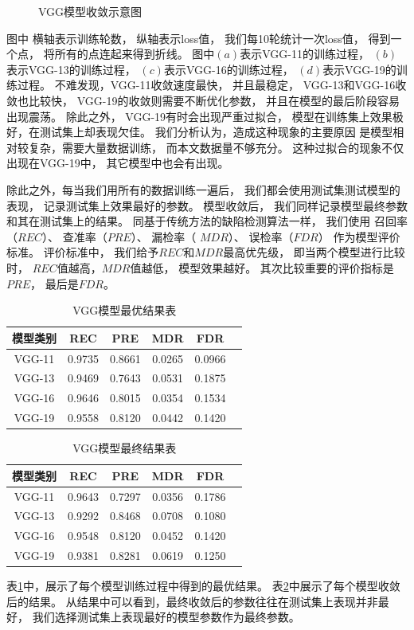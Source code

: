 \begin{figure}[htbp]
\caption{VGG模型收敛示意图}
\label{fig:vggshoulian}
\end{figure}
图中
横轴表示训练轮数，
纵轴表示loss值，
我们每10轮统计一次loss值，
得到一个点，
将所有的点连起来得到折线。
图中$(a)$表示VGG-11的训练过程，
$(b)$表示VGG-13的训练过程，
$(c)$表示VGG-16的训练过程，
$(d)$表示VGG-19的训练过程。
不难发现，VGG-11收敛速度最快，
并且最稳定，
VGG-13和VGG-16收敛也比较快，
VGG-19的收敛则需要不断优化参数，
并且在模型的最后阶段容易出现震荡。
除此之外，
VGG-19有时会出现严重过拟合，
模型在训练集上效果极好，在测试集上却表现欠佳。
我们分析认为，造成这种现象的主要原因
是模型相对较复杂，需要大量数据训练，
而本文数据量不够充分。
这种过拟合的现象不仅出现在VGG-19中，
其它模型中也会有出现。

除此之外，每当我们用所有的数据训练一遍后，
我们都会使用测试集测试模型的表现，
记录测试集上效果最好的参数。
模型收敛后，
我们同样记录模型最终参数和其在测试集上的结果。
同基于传统方法的缺陷检测算法一样，
我们使用
召回率（$REC$）、
查准率（$PRE$）、
漏检率（ $MDR$）、
误检率（$FDR$）
作为模型评价标准。
评价标准中，
我们给予$REC$和$MDR$最高优先级，
即当两个模型进行比较时，
$REC$值越高，$MDR$值越低，
模型效果越好。
其次比较重要的评价指标是$PRE$，
最后是$FDR$。
\begin{table}[htbp]
\centering
\begin{tabular}{cccccp{38mm}}
\toprule
\textbf{模型类别} & \textbf{REC} & \textbf{PRE} & \textbf{MDR} & \textbf{FDR}\\
\midrule
\mbox{VGG-11} & 0.9735 & 0.8661 & 0.0265 & 0.0966\\
\mbox{VGG-13} & 0.9469 & 0.7643 & 0.0531 & 0.1875\\
\mbox{VGG-16} & 0.9646 & 0.8015 & 0.0354 & 0.1534\\
\mbox{VGG-19} & 0.9558 & 0.8120 & 0.0442 & 0.1420\\
\bottomrule
\end{tabular}
\caption{VGG模型最优结果表}
\label{tab:zuiyoujieguo}
\end{table}
\begin{table}[htbp]
\centering
\begin{tabular}{cccccp{38mm}}
\toprule
\textbf{模型类别} & \textbf{REC} & \textbf{PRE} & \textbf{MDR} & \textbf{FDR}\\
\midrule
\mbox{VGG-11} & 0.9643 & 0.7297 & 0.0356 & 0.1786\\
\mbox{VGG-13} & 0.9292 & 0.8468 & 0.0708 & 0.1080\\
\mbox{VGG-16} & 0.9548 & 0.8120 & 0.0452 & 0.1420\\
\mbox{VGG-19} & 0.9381 & 0.8281 & 0.0619 & 0.1250\\
\bottomrule
\end{tabular}
\caption{VGG模型最终结果表}
\label{tab:zuizhongjieguo}
\end{table}
表\ref{tab:zuiyoujieguo}中，展示了每个模型训练过程中得到的最优结果。
表\ref{tab:zuizhongjieguo}中展示了每个模型收敛后的结果。
从结果中可以看到，最终收敛后的参数往往在测试集上表现并非最好，
我们选择测试集上表现最好的模型参数作为最终参数。


